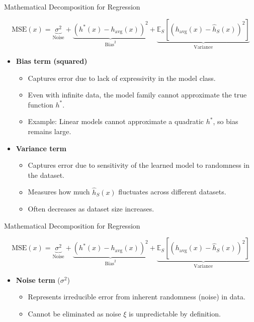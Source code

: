 \documentclass{beamer}
\begin{document}
\begin{frame}{Mathematical Decomposition for Regression}

    \[
    \boxed{ \text{MSE}(x) = \underbrace{ \sigma^2 }_{\text{Noise}} + \underbrace{ (h^*(x) - h_{\text{avg}}(x))^2 }_{\text{Bias}^2} + \underbrace{ \mathbb{E}_S \left[ (h_{\text{avg}}(x) - \hat{h}_S(x))^2 \right] }_{\text{Variance}} }
    \]

    \small
    \begin{itemize}
        \item \textbf{Bias term (squared)}  
        \begin{itemize}
            \item Captures error due to lack of expressivity in the model class.
            \item Even with infinite data, the model family cannot approximate the true function $h^*$.
            \item Example: Linear models cannot approximate a quadratic $h^*$, so bias remains large.
        \end{itemize}
    
        \vspace{0.2cm}
    
        \item \textbf{Variance term}  
        \begin{itemize}
            \item Captures error due to sensitivity of the learned model to randomness in the dataset.
            \item Measures how much $\hat{h}_S(x)$ fluctuates across different datasets.
            \item Often decreases as dataset size increases.
        \end{itemize}
    
        \vspace{0.2cm}
    \end{itemize}

\end{frame}

\begin{frame}{Mathematical Decomposition for Regression}

    \[
    \boxed{ \text{MSE}(x) = \underbrace{ \sigma^2 }_{\text{Noise}} + \underbrace{ (h^*(x) - h_{\text{avg}}(x))^2 }_{\text{Bias}^2} + \underbrace{ \mathbb{E}_S \left[ (h_{\text{avg}}(x) - \hat{h}_S(x))^2 \right] }_{\text{Variance}} }
    \]

    \small
    \begin{itemize}
        \item \textbf{Noise term} ($\sigma^2$)  
        \begin{itemize}
            \item Represents irreducible error from inherent randomness (noise) in data.
            \item Cannot be eliminated as noise $\xi$ is unpredictable by definition.
        \end{itemize}
    \end{itemize}

\end{frame}
\end{document}
